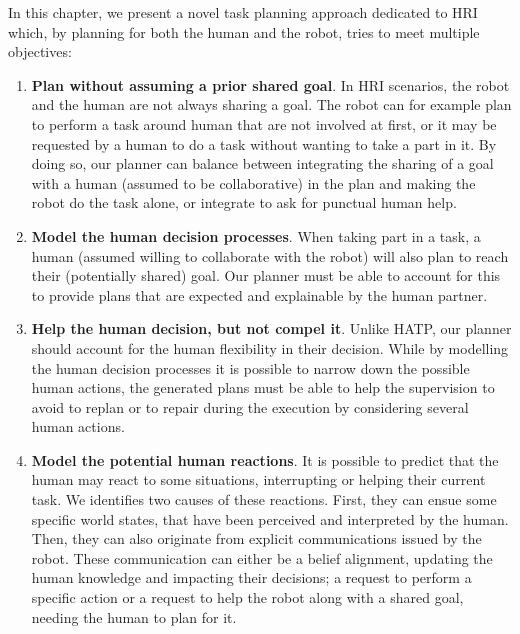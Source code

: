 \documentclass[a4paper,11pt,twoside]{StyleThese}
\begin{document}
\smallskip

In this chapter, we present a novel task planning approach dedicated to HRI which, by planning for both the human and the robot, tries to meet multiple objectives:

\begin{enumerate}
\item \textbf{Plan without assuming a prior shared goal}. In HRI scenarios, the robot and the human are not always sharing a goal. The robot can for example plan to perform a task around human that are not involved at first, or it may be requested by a human to do a task without wanting to take a part in it. By doing so, our planner can balance between integrating the sharing of a goal with a human (assumed to be collaborative) in the plan and making the robot do the task alone, or integrate to ask for punctual human help.

\item \textbf{Model the human decision processes}. When taking part in a task, a human (assumed willing to collaborate with the robot) will also plan to reach their (potentially shared) goal. Our planner must be able to account for this to provide plans that are expected and explainable by the human partner.

\item \textbf{Help the human decision, but not compel it}. Unlike HATP, our planner should account for the human flexibility in their decision. While by modelling the human decision processes it is possible to narrow down the possible human actions, the generated plans must be able to help the supervision to avoid to replan or to repair during the execution by considering several human actions.

\item \textbf{Model the potential human reactions}. It is possible to predict that the human may react to some situations, interrupting or helping their current task. We identifies two causes of these reactions. First, they can ensue some specific world states, that have been perceived and interpreted by the human. Then, they can also originate from explicit communications issued by the robot. These communication can either be a belief alignment, updating the human knowledge and impacting their decisions; a request to perform a specific action or a request to help the robot along with a shared goal, needing the human to plan for it.


\end{enumerate}
\end{document}
